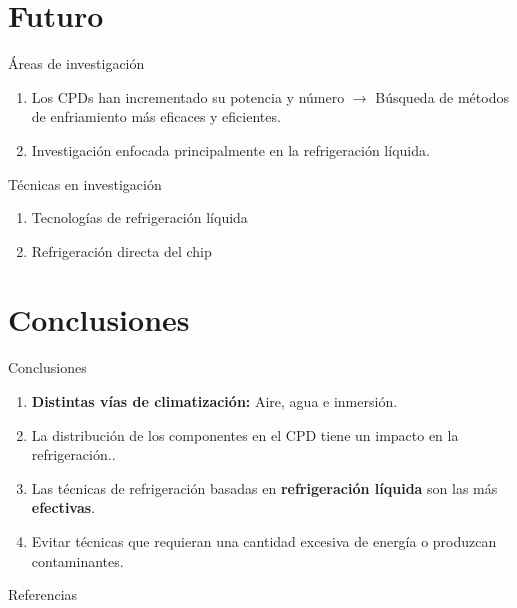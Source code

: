 \documentclass[aspectratio=169, compress]{beamer}
\begin{document}
\section{Futuro}

\begin{frame}{Áreas de investigación}
    \begin{enumerate}
        \item Los CPDs han incrementado su potencia y número $\rightarrow$ Búsqueda de métodos de enfriamiento más eficaces y eficientes.
        \item Investigación enfocada principalmente en la refrigeración líquida.
    \end{enumerate}
\end{frame}

\begin{frame}{Técnicas en investigación}
    \begin{enumerate}
        \item Tecnologías de refrigeración líquida
        \item Refrigeración directa del chip
    \end{enumerate}
\end{frame}


\section{Conclusiones}

\begin{frame}{Conclusiones}
    \begin{enumerate}
        \item \textbf{Distintas vías de climatización:} Aire, agua e inmersión.
        \item La distribución de los componentes en el CPD tiene un impacto en la refrigeración.. 
        \item Las técnicas de refrigeración basadas en \textbf{refrigeración líquida} son las más \textbf{efectivas}.
        \item Evitar técnicas que requieran una cantidad excesiva de energía o produzcan contaminantes.
    \end{enumerate}
\end{frame}

\begin{frame}{Referencias}
    
    
\end{frame}
\end{document}

